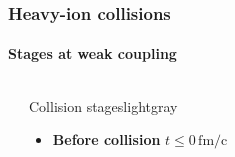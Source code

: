 \documentclass[aspectratio=169,11pt,usenames,dvipsnames]{beamer}
\begin{document}
\begin{frame}
    \frametitle{Heavy-ion collisions}
    \framesubtitle{Stages at weak coupling}
    \vspace{-15pt}
    \begin{columns}[onlytextwidth,t]
            \begin{center}
                \vspace{-5pt}
            \end{center}
            \vspace{10pt}
            \begin{center}
            \begin{custombox2}{\color{normal}Collision stages}{lightgray}
                \small
                \begin{varwidth}{0.7\textwidth}
                \begin{itemize}\itemsep0em 
                    \item {{\bfseries\color{isgold}Before collision} {\tiny $t\leq 0\,\mathrm{fm/c}$}}\\[1pt]

\end{itemize}
\end{varwidth}
\end{custombox2}
\end{center}
\end{columns}
\end{frame}
\end{document}
